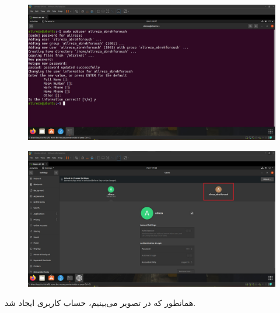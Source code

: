 \documentclass{article}
\begin{document}


\newpage



\section{}
\begin{figure}[H]
    \centering
    \includegraphics[width=1.0\textwidth]{figures/1a.jpg}
    \caption
	{
	}
    \label{fig:fig1}
\end{figure}


\begin{figure}[H]
    \centering
    \includegraphics[width=1.0\textwidth]{figures/1b.jpg}
    \caption
	{
	}
    \label{fig:fig1}
\end{figure}
همانطور که در تصویر می‌بینیم، حساب کاربری ایجاد شد.
\end{document}
